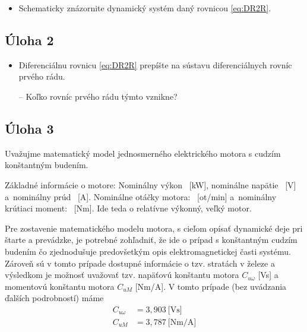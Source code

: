 \documentclass[a4paper, 10pt, ]{article}
\begin{document}
\begin{itemize}[leftmargin=0pt, labelsep=3mm, itemsep=0pt]
    \item Schematicky znázornite dynamický systém daný rovnicou \eqref{eq:DR2R}.
\end{itemize}




\subsection{Úloha 2} \label{cv2u2}

\begin{itemize}[leftmargin=0pt, labelsep=3mm, itemsep=0pt]
    \item Diferenciálnu rovnicu \eqref{eq:DR2R} prepíšte na sústavu diferenciálnych rovníc prvého rádu.
\end{itemize}


\begin{itemize}[leftmargin=0pt, labelsep=3mm, itemsep=0pt]
    \item[--] Koľko rovníc prvého rádu týmto vznikne?
\end{itemize}


\subsection{Úloha 3}

Uvažujme matematický model jednosmerného elektrického motora s cudzím konštantným budením. 

Základné informácie o motore: Nominálny výkon ~[kW], nominálne napätie ~[V] a~nominálny prúd ~[A]. Nominálne otáčky motora: ~[ot/min] a~nominálny krútiaci moment: ~[Nm]. Ide teda o relatívne výkonný, veľký motor.

Pre zostavenie matematického modelu motora, s cieľom opísať dynamické deje pri štarte a prevádzke, je potrebné zohľadniť, že ide o prípad s konštantným cudzím budením čo zjednodušuje predovšetkým opis elektromagnetickej časti systému. Zároveň sú v tomto prípade dostupné informácie o tzv. stratách v železe a výsledkom je možnosť uvažovať tzv. napäťovú konštantu motora $C_{u\omega}$ [Vs] a momentovú konštantu motora $C_{uM}$ [Nm/A]. V tomto prípade (bez uvádzania ďalších podrobností) máme
\begin{subequations}
	\begin{align}
		C_{u\omega} &= 3,903\ \text{[Vs]}\\
		C_{uM} &= 3,787\ \text{[Nm/A]}
	\end{align}
\end{subequations}
\end{document}
